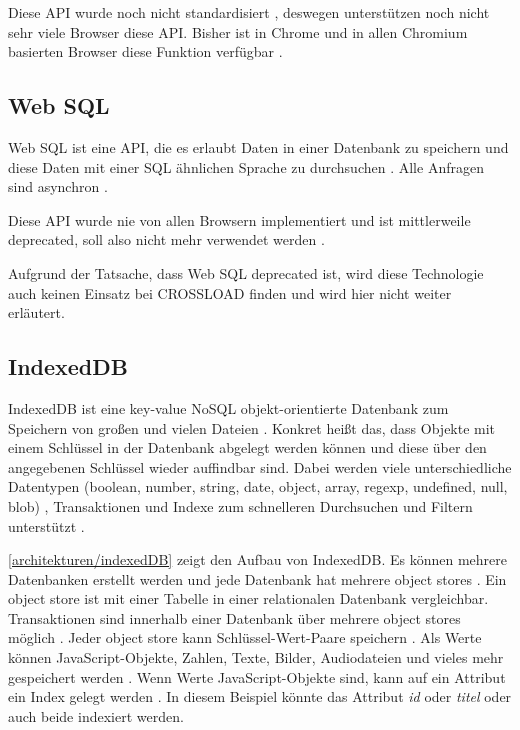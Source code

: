 Diese \ac{API} wurde noch nicht standardisiert \autocite{mdn-file-system} \autocite{caniuse-filesystem}, deswegen unterstützen noch nicht sehr viele Browser diese \ac{API}. Bisher ist in Chrome und in allen Chromium basierten Browser diese Funktion verfügbar \autocite{caniuse-filesystem}.

\subsection{Web SQL}
Web SQL ist eine \ac{API}, die es erlaubt Daten in einer Datenbank zu speichern und diese Daten mit einer SQL ähnlichen Sprache zu durchsuchen \autocite{w3-web-sql}. Alle Anfragen sind asynchron \autocite{Hajian2019}.

Diese \ac{API} wurde nie von allen Browsern implementiert und ist mittlerweile deprecated, soll also nicht mehr verwendet werden \autocite{Hajian2019}.

Aufgrund der Tatsache, dass Web SQL deprecated ist, wird diese Technologie auch keinen Einsatz bei CROSSLOAD finden und wird hier nicht weiter erläutert. 

\subsection{IndexedDB}
IndexedDB ist eine key-value NoSQL objekt-orientierte Datenbank zum Speichern von großen und vielen Dateien \autocite{Hajian2019}. Konkret heißt das, dass Objekte mit einem Schlüssel in der Datenbank abgelegt werden können und diese über den angegebenen Schlüssel wieder auffindbar sind. Dabei werden viele unterschiedliche Datentypen (boolean, number, string, date, object, array, regexp, undefined, null, \ac{blob}) \autocite{mdn-indexeddb}, Transaktionen und Indexe zum schnelleren Durchsuchen und Filtern unterstützt \autocite{Sheppard2017}. 

\autoref{architekturen/indexedDB} zeigt den Aufbau von IndexedDB. Es können mehrere Datenbanken erstellt werden und jede Datenbank hat mehrere object stores \autocite{mdn-indexeddb}. Ein object store ist mit einer Tabelle in einer relationalen Datenbank vergleichbar. Transaktionen sind innerhalb einer Datenbank über mehrere object stores möglich \autocite{mdn-indexeddb}. Jeder object store kann Schlüssel-Wert-Paare speichern \autocite{Sheppard2017}. Als Werte können JavaScript-Objekte, Zahlen, Texte, Bilder, Audiodateien und vieles mehr gespeichert werden \autocite{mdn-indexeddb}. Wenn Werte JavaScript-Objekte sind, kann auf ein Attribut ein Index gelegt werden \autocite{mdn-indexeddb}. In diesem Beispiel könnte das Attribut \textit{id} oder \textit{titel} oder auch beide indexiert werden.

